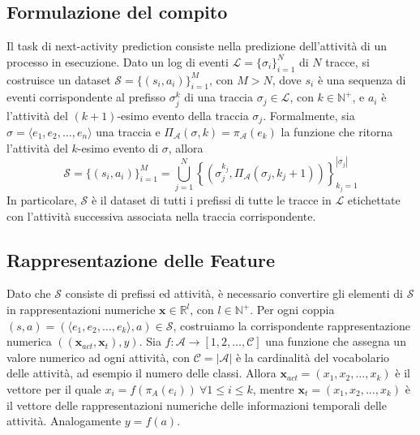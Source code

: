 \documentclass[12pt,a4paper]{report}
\begin{document}
    \subsection{Formulazione del compito}
    Il task di next-activity prediction consiste nella predizione
    dell'attivit\`a di un processo in esecuzione.
    Dato un log di eventi $\mathcal{L}=\{\sigma_i\}_{i=1}^N$ di $N$
    tracce, si costruisce un dataset 
    $\mathcal{S}=\{(s_i,a_i)\}_{i=1}^M$, con $M>N$, dove $s_i$ \`e una
    sequenza di eventi corrispondente al prefisso $\sigma_j^k$ di una
    traccia $\sigma_j\in\mathcal{L}$, con $k\in\mathbb{N}^+$, e 
    $a_i$ \`e l'attivit\`a del $(k+1)$-esimo evento della traccia
    $\sigma_j$. Formalmente, sia $\sigma=\langle e_1, e_2, \dots, e_n
    \rangle$ una traccia e $\Pi_{\mathcal{A}}(\sigma,k)=
    \pi_{\mathcal{A}}(e_k)$ la funzione che ritorna l'attivit\`a del 
    $k$-esimo evento di $\sigma$, allora
    \begin{equation}
        \mathcal{S}=\{(s_i,a_i)\}_{i=1}^M=
        \bigcup\limits_{j=1}^N\left\{
        (\sigma_j^{k_j},\Pi_{\mathcal{A}}(\sigma_j,k_j+1))
        \right\}_{k_j=1}^{|\sigma_j|}
    \end{equation}
    In particolare, $\mathcal{S}$ \`e il dataset di tutti i prefissi
    di tutte le tracce in $\mathcal{L}$ etichettate con l'attivit\`a
    successiva associata nella traccia corrispondente.

    \subsection{Rappresentazione delle Feature}
    Dato che $\mathcal{S}$ consiste di prefissi ed attivit\`a, \`e
    necessario convertire gli elementi di $\mathcal{S}$ in 
    rappresentazioni numeriche $\boldsymbol{x}\in\mathbb{R}^l$, con 
    $l\in\mathbb{N}^+$. Per ogni coppia $(s,a)=(\langle 
    e_1,e_2,\dots,e_k\rangle, a)\in\mathcal{S}$, costruiamo la
    corrispondente rappresentazione numerica $((\boldsymbol{x}_{act}, 
    \boldsymbol{x}_t),y)$. Sia $f:\mathcal{A}\rightarrow[1,2,\dots,
    \mathcal{C}]$ una funzione che assegna un valore numerico ad ogni
    attivit\`a, con $\mathcal{C}=|\mathcal{A}|$ \`e la cardinalit\`a
    del vocabolario delle attivit\`a, ad esempio il numero delle classi.
    Allora $\boldsymbol{x}_{act}=(x_1,x_2,\dots,x_k)$ \`e il vettore per
    il quale $x_i=f(\pi_A(e_i))\ \forall 1\leq i\leq k$, mentre 
    $\boldsymbol{x}_{t}=(x_1,x_2,\dots,x_k)$ \`e il vettore delle
    rappresentazioni numeriche delle informazioni temporali delle
    attivit\`a. Analogamente $y=f(a)$. 
\end{document}

